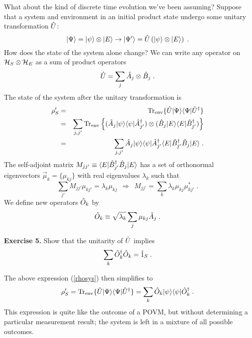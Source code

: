What about the kind of discrete time evolution we've been assuming?
Suppose that a system and environment in an initial product state
undergo some unitary transformation ${\hat U}$:
\begin{equation}
{| \Psi \rangle} = {| \psi \rangle}\otimes{| E \rangle}
  \rightarrow {| \Psi' \rangle} = {\hat U} \left( {| \psi \rangle}\otimes{| E \rangle} \right) \;.
\end{equation}
How does the state of the system alone change?  We can write any operator
on ${\cal H}_S\otimes{\cal H}_E$ as a sum of product
operators
\begin{equation}
{\hat U} = \sum_j {\hat A}_j \otimes {\hat B}_j \;.
\end{equation}
The state of the system after the unitary transformation is
\begin{eqnarray}
\rho'_S &=& {\rm Tr}_{\rm env} \{ {\hat U} {| \Psi \rangle}{\langle \Psi |} {\hat U^\dagger} \} \nonumber\\
&=&  \sum_{j,j'} {\rm Tr}_{\rm env} \left\{
  ({\hat A}_j{| \psi \rangle}{\langle \psi |}{\hat A^\dagger}_{j'})\otimes
  ({\hat B}_j{| E \rangle}{\langle E |}{\hat B^\dagger}_{j'}) \right\} \nonumber\\
&=&  \sum_{j,j'}
  {\hat A}_j{| \psi \rangle}{\langle \psi |}{\hat A^\dagger}_{j'}
  {\langle E |}{\hat B^\dagger}_{j'}{\hat B}_j{| E \rangle} \;.
\label{rhosys}
\end{eqnarray}
The self-adjoint matrix $M_{jj'} \equiv {\langle E |}{\hat B^\dagger}_{j'}{\hat B}_j{| E \rangle}$
has a set of orthonormal eigenvectors $\vec\mu_k = \{\mu_{kj}\}$
with real eigenvalues $\lambda_k$ such that
\begin{equation}
\sum_{j'} M_{jj'}\mu_{kj'} = \lambda_k \mu_{kj}\ \ 
  \Rightarrow\ \ M_{jj'} = \sum_k \lambda_k \mu_{kj}\mu^*_{kj'} \;.
\label{eigenvecs}
\end{equation}
We define new operators ${\hat O}_k$ by
\begin{equation}
{\hat O}_k \equiv \sqrt{\lambda_k} \sum_j \mu_{kj} {\hat A}_j \;.
\label{eigen_operators}
\end{equation}

\medskip\noindent
{\bf Exercise 5.}  Show that the unitarity of ${\hat U}$ implies
\begin{equation}
\sum_k {\hat O^\dagger}_k{\hat O}_k = {\hat 1}_S \;.
\end{equation}
\medskip

The above expression (\ref{rhosys}) then simplifies to
\begin{equation}
\rho'_S = {\rm Tr}_{\rm env} \{ {\hat U} {| \Psi \rangle}{\langle \Psi |} {\hat U^\dagger} \}
  = \sum_k {\hat O}_k {| \psi \rangle}{\langle \psi |} {\hat O^\dagger}_k \;.
\end{equation}
This expression is quite like the outcome of a POVM, but without determining
a particular measurement result; the system is left in a mixture of all
possible outcomes.

